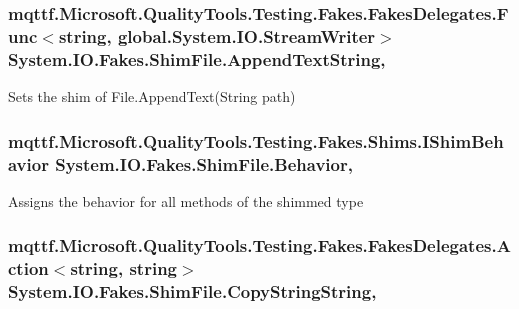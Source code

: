 \hypertarget{class_system_1_1_i_o_1_1_fakes_1_1_shim_file_ad96462ccb8941464b61125a3e6823386}{
\subsubsection[{Append\-Text\-String}]{\setlength{\rightskip}{0pt plus 5cm}mqttf.\-Microsoft.\-Quality\-Tools.\-Testing.\-Fakes.\-Fakes\-Delegates.\-Func$<$string, global.\-System.\-I\-O.\-Stream\-Writer$>$ System.\-I\-O.\-Fakes.\-Shim\-File.\-Append\-Text\-String\hspace{0.3cm}{\ttfamily [static]}, {\ttfamily [set]}}}\label{class_system_1_1_i_o_1_1_fakes_1_1_shim_file_ad96462ccb8941464b61125a3e6823386}


Sets the shim of File.\-Append\-Text(\-String path)

\hypertarget{class_system_1_1_i_o_1_1_fakes_1_1_shim_file_af5671d00f8e459e6ad7beb52de437973}{
\subsubsection[{Behavior}]{\setlength{\rightskip}{0pt plus 5cm}mqttf.\-Microsoft.\-Quality\-Tools.\-Testing.\-Fakes.\-Shims.\-I\-Shim\-Behavior System.\-I\-O.\-Fakes.\-Shim\-File.\-Behavior\hspace{0.3cm}{\ttfamily [static]}, {\ttfamily [set]}}}\label{class_system_1_1_i_o_1_1_fakes_1_1_shim_file_af5671d00f8e459e6ad7beb52de437973}


Assigns the behavior for all methods of the shimmed type

\hypertarget{class_system_1_1_i_o_1_1_fakes_1_1_shim_file_a37e452847b42be5a401f1a52f05f720f}{
\subsubsection[{Copy\-String\-String}]{\setlength{\rightskip}{0pt plus 5cm}mqttf.\-Microsoft.\-Quality\-Tools.\-Testing.\-Fakes.\-Fakes\-Delegates.\-Action$<$string, string$>$ System.\-I\-O.\-Fakes.\-Shim\-File.\-Copy\-String\-String\hspace{0.3cm}{\ttfamily [static]}, {\ttfamily [set]}}}\label{class_system_1_1_i_o_1_1_fakes_1_1_shim_file_a37e452847b42be5a401f1a52f05f720f}


